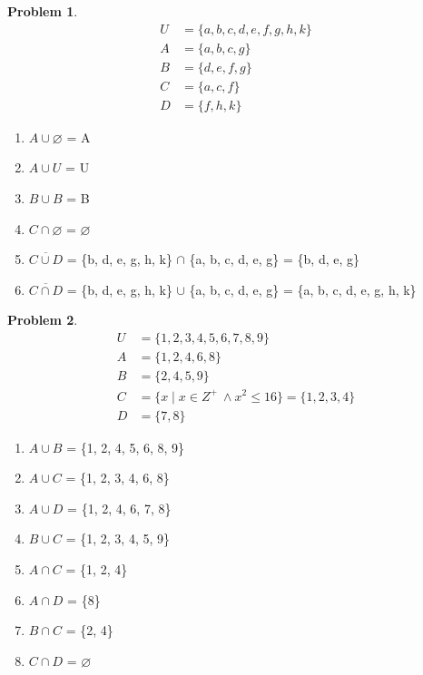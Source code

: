 \documentclass{article}
\theoremstyle{definition}
\newtheorem{problem}{Problem}[section]
\begin{document}
\begin{problem}
\[
    \begin{aligned}
        U &= \{a, b, c, d, e, f, g, h, k\}\\
        A &= \{a, b, c, g\}\\
        B &= \{d, e, f, g\}\\
        C &= \{a, c, f\}\\
        D &= \{f, h, k\}
    \end{aligned}
\]
    \begin{enumerate}[label=(\alph*)]
        Compute

        \item \(A \cup \varnothing\) = A
        \item \(A \cup U\) = U
        \item \(B \cup B\) = B
        \item \(C \cap \varnothing\) = $\varnothing$
        \item \(\overline{C \cup D}\) = \{b, d, e, g, h, k\} $\cap$ \{a, b, c, d, e, g\} = \{b, d, e, g\}
        \item \(\overline{C \cap D}\) = \{b, d, e, g, h, k\} $\cup$ \{a, b, c, d, e, g\} = \{a, b, c, d, e, g, h, k\}

    \end{enumerate}
\end{problem}



\begin{problem}
\[
    \begin{aligned}
        U &= \{1, 2, 3, 4, 5, 6, 7, 8, 9\}\\
        A &= \{1, 2, 4, 6, 8\}\\
        B &= \{2, 4, 5, 9\}\\
        C &= \{x \mid x \in Z^+\ \land x^2 \leq 16\}=\{1, 2, 3, 4\}\\
        D &= \{7, 8\}
    \end{aligned}
\]
    \begin{enumerate}[label=(\alph*)]
        Compute

        \item \(A \cup B\) = \{1, 2, 4, 5, 6, 8, 9\}
        \item \(A \cup C\) = \{1, 2, 3, 4, 6, 8\}
        \item \(A \cup D\) = \{1, 2, 4, 6, 7, 8\}
        \item \(B \cup C\) = \{1, 2, 3, 4, 5, 9\}
        \item \(A \cap C\) = \{1, 2, 4\}
        \item \(A \cap D\) = \{8\}
        \item \(B \cap C\) = \{2, 4\}
        \item \(C \cap D\) = $\varnothing$
    \end{enumerate}
\end{problem}
\end{document}
